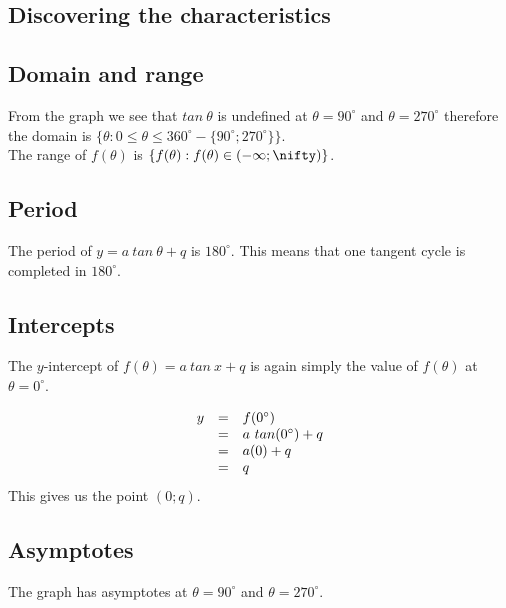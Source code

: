 \subsection*{Discovering the characteristics}
\subsection*{Domain and range}

From the graph we see that $tan~\theta$ is undefined at $\theta=90^{\circ}$ and $\theta=270^{\circ}$ therefore the domain is $\{\theta: 0 \leq\theta\leq360^{\circ} - \{90^{\circ}; 270^{\circ}\}\}$.\\
The range of $f(\theta)$ is $\{f(\theta): f(\theta) \in (-\infty; \nifty)\}$.

\subsection*{Period}
The period of $y=a~tan~\theta+q$ is $180^{\circ}$. This means that one tangent cycle is completed in $180^{\circ}$. 


\subsection*{Intercepts}
\nopagebreak
The $y$-intercept of $f(\theta )=a~tan~x+q$ is again simply the value of $f(\theta )$ at $\theta ={0}^{\circ }$.\par 

\begin{equation*}
\begin{array}{ccl}\hfill y& =& f({0}^{\circ })\hfill \\
 & =& a~tan({0}^{\circ })+q\hfill \\
 & =& a(0)+q\hfill \\
 & =& q\hfill 
\end{array}
\end{equation*}
This gives us the point $(0;q)$.
\subsection*{Asymptotes}
\nopagebreak
The graph has asymptotes at $\theta ={90}^{\circ }$ and $\theta={270}^{\circ }$.

